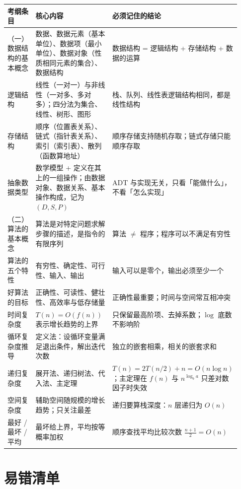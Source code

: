 \documentclass[11pt,openany,UTF8]{ctexbook}
\begin{document}
\begingroup\small\setlength{\tabcolsep}{4.0pt}
\begin{longtable}{@{}L{0.1303\linewidth}L{0.4508\linewidth}L{0.3474\linewidth}@{}}
\toprule
\textbf{考纲条目} & \textbf{核心内容} & \textbf{必须记住的结论} \\
\midrule
\endhead
（一）数据结构的基本概念 & 数据、数据元素（基本单位）、数据项（最小单位）、数据对象（性质相同元素的集合）、数据结构 & 数据结构 = 逻辑结构 + 存储结构 + 数据的运算 \\
逻辑结构 & 线性（一对一）与非线性（一对多、多对多）；四分法为集合、线性、树形、图形 & 栈、队列、线性表逻辑结构相同，都是线性结构 \\
存储结构 & 顺序（位置表关系）、链式（指针表关系）、索引（索引表）、散列（函数算地址） & 顺序存储支持随机存取；链式存储只能顺序存取 \\
抽象数据类型 & 数学模型 + 定义在其上的一组操作；由数据对象、数据关系、基本操作构成，记为 $(D,S,P)$ & ADT 与实现无关，只看「能做什么」，不看「怎么实现」 \\
（二）算法的基本概念 & 算法是对特定问题求解步骤的描述，是指令的有限序列 & 算法 $\neq$ 程序；程序可以不满足有穷性 \\
算法的五个特性 & 有穷性、确定性、可行性、输入、输出 & 输入可以是零个，输出必须至少一个 \\
好算法的目标 & 正确性、可读性、健壮性、高效率与低存储量 & 正确性最重要；时间与空间常互相冲突 \\
时间复杂度 & $T(n)=O(f(n))$ 表示增长趋势的上界 & 只保留最高阶项、去掉系数；$\log$ 底数不影响阶 \\
循环复杂度推导 & 定义法：设循环变量满足退出条件，解出迭代次数 & 独立的嵌套相乘，相关的嵌套求和 \\
递归复杂度 & 展开法、递归树法、代入法、主定理 & $T(n)=2T(n/2)+n=O(n\log n)$；主定理在 $f(n)$ 与 $n^{\log_b a}$ 只差对数因子时失效 \\
空间复杂度 & 辅助空间随规模的增长趋势；只关注最差 & 递归要算栈深度：$n$ 层递归为 $O(n)$ \\
最好 / 最坏 / 平均 & 最坏给上界，平均按等概率加权 & 顺序查找平均比较次数 $\frac{n+1}{2}=O(n)$ \\
\bottomrule
\end{longtable}
\endgroup

\section*{易错清单}
\end{document}
